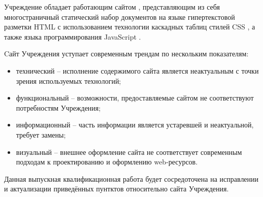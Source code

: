 Учреждение обладает работающим сайтом \cite{meson-uc}, представляющим из себя многостраничный статический набор документов на языке гипертекстовой разметки HTML \cite{wiki-html} с использованием технологии каскадных таблиц стилей CSS \cite{wiki-css}, а также языка программирования JavaScript \cite{wiki-js}.

Cайт Учреждения уступает современным трендам по нескольким показателям:
\begin{itemize}
    \item технический -- исполнение содержимого сайта является неактуальным с точки зрения используемых технологий;
    \item функциональный -- возможности, предоставляемые сайтом не соответствуют потребностям Учреждения;
    \item информационный -- часть информации является устаревшей и неактуальной, требует замены;
    \item визуальный -- внешнее оформление сайта не соответствует современным подходам к проектированию и оформлению web-ресурсов.
\end{itemize}

Данная выпускная квалификационная работа будет сосредоточена на исправлении и актуализации приведённых пунтктов относительно сайта Учреждения.

\clearpage

